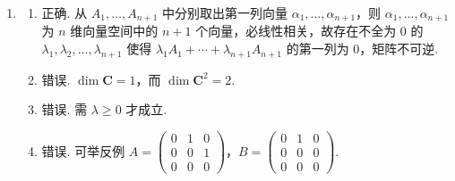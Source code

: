 \begin{enumerate}
    \item \begin{enumerate}
        \item 正确. 从 $A_1, \ldots, A_{n+1}$ 中分别取出第一列向量 $\alpha_1, \ldots, \alpha_{n+1}$，则 $\alpha_1, \ldots, \alpha_{n+1}$ 为 $n$ 维向量空间中的 $n+1$ 个向量，必线性相关，故存在不全为 $0$ 的 $\lambda_1, \lambda_2, \ldots, \lambda_{n+1}$ 使得 $\lambda_1 A_1 + \cdots + \lambda_{n+1} A_{n+1}$ 的第一列为 $0$，矩阵不可逆.
        \item 错误. $\dim \mathbf{C}=1$，而 $\dim \mathbf{C}^{2}=2$.
        \item 错误. 需 $\lambda \geqslant 0$ 才成立.
        \item 错误. 可举反例 $A=\begin{pmatrix}0&1&0\\ 0&0&1\\ 0&0&0\end{pmatrix}$，$B=\begin{pmatrix} 0&1&0 \\ 0&0&0 \\ 0&0&0 \end{pmatrix}$.
    \end{enumerate}
\end{enumerate}

\clearpage
